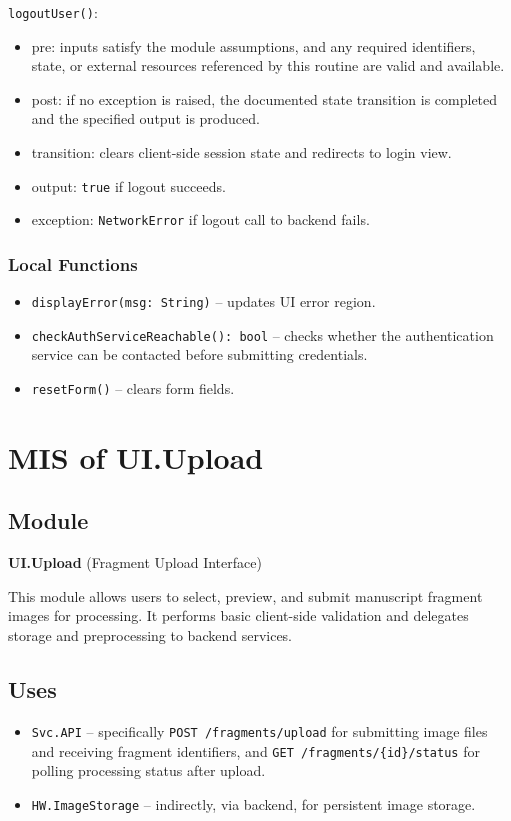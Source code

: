 \documentclass[12pt, titlepage]{article}
\begin{document}
\noindent \texttt{logoutUser()}:
\begin{itemize}
    \item pre: inputs satisfy the module assumptions, and any required identifiers, state, or external resources referenced by this routine are valid and available.
    \item post: if no exception is raised, the documented state transition is completed and the specified output is produced.
    \item transition: clears client-side session state and redirects to login view.
    \item output: \texttt{true} if logout succeeds.
    \item exception: \texttt{NetworkError} if logout call to backend fails.
\end{itemize}

\subsubsection{Local Functions}
\begin{itemize}
    \item \texttt{displayError(msg: String)} – updates UI error region.
    \item \texttt{checkAuthServiceReachable(): bool} – checks whether the authentication service can be contacted before submitting credentials.
    \item \texttt{resetForm()} – clears form fields.
\end{itemize}



\section{MIS of UI.Upload} \label{UI.Upload}

\subsection{Module}
\textbf{UI.Upload} \; (Fragment Upload Interface)

This module allows users to select, preview, and submit manuscript fragment images for processing. It performs basic client-side validation and delegates storage and preprocessing to backend services.

\subsection{Uses}
\begin{itemize}
    \item \texttt{Svc.API} – specifically \texttt{POST /fragments/upload} for submitting image files and receiving fragment identifiers, and \texttt{GET /fragments/\{id\}/status} for polling processing status after upload.
    \item \texttt{HW.ImageStorage} – indirectly, via backend, for persistent image storage.
\end{itemize}
\end{document}
